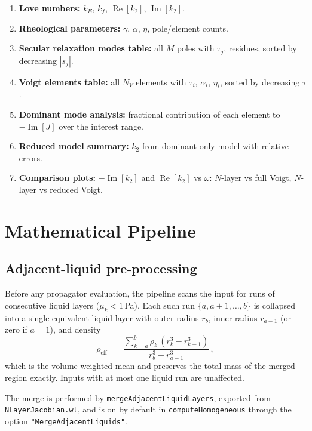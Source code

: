\documentclass[11pt]{article}
\begin{document}
\begin{enumerate}
  \item \textbf{Love numbers:} $k_E$, $k_f$,
    $\operatorname{Re}[k_2]$, $\operatorname{Im}[k_2]$.
  \item \textbf{Rheological parameters:} $\gamma$, $\alpha$,
    $\eta$, pole/element counts.
  \item \textbf{Secular relaxation modes table:} all $M$ poles with
    $\tau_j$, residues, sorted by decreasing $|s_j|$.
  \item \textbf{Voigt elements table:} all $N_V$ elements with
    $\tau_i$, $\alpha_i$, $\eta_i$, sorted by decreasing $\tau$.
  \item \textbf{Dominant mode analysis:} fractional contribution of
    each element to $-\operatorname{Im}[J]$ over the interest range.
  \item \textbf{Reduced model summary:} $k_2$ from dominant-only
    model with relative errors.
  \item \textbf{Comparison plots:}
    $-\operatorname{Im}[k_2]$ and $\operatorname{Re}[k_2]$ vs
    $\omega$: $N$-layer vs full Voigt, $N$-layer vs reduced Voigt.
\end{enumerate}

\section{Mathematical Pipeline}
\label{sec:math}

\subsection{Adjacent-liquid pre-processing}
\label{sec:liquid-merge}

Before any propagator evaluation, the pipeline scans the input for
runs of consecutive liquid layers ($\mu_k < 1$\,Pa). Each such run
$\{a, a+1, \ldots, b\}$ is collapsed into a single equivalent liquid
layer with outer radius $r_b$, inner radius $r_{a-1}$ (or zero if
$a=1$), and density
\begin{equation}
  \rho_{\mathrm{eff}} \;=\;
  \frac{\sum_{k=a}^{b} \rho_k\,(r_k^3 - r_{k-1}^3)}
       {r_b^3 - r_{a-1}^3}\,,
\end{equation}
which is the volume-weighted mean and preserves the total mass of
the merged region exactly. Inputs with at most one liquid run are
unaffected.

The merge is performed by \texttt{mergeAdjacentLiquidLayers},
exported from \texttt{NLayerJacobian.wl}, and is on by default in
\texttt{computeHomogeneous} through the option
\texttt{"MergeAdjacentLiquids"}.
\end{document}
